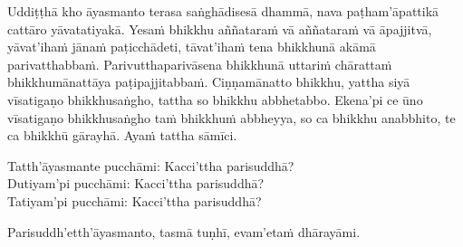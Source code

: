 \begin{center}
	Uddiṭṭhā kho āyasmanto terasa saṅghādisesā dhammā, nava paṭham'āpattikā\makeatletter\hyperlink{endnote103-appendix}\makeatother{} cattāro yāvatatiyakā. Yesaṁ bhikkhu aññataraṁ vā aññataraṁ vā āpajjitvā, yāvat'ihaṁ\makeatletter\hyperlink{endnote104-appendix}\makeatother{} jānaṁ paṭicchādeti, tāvat'ihaṁ\makeatletter\hyperlink{endnote105-appendix}\makeatother{} tena bhikkhunā akāmā parivatthabbaṁ.\makeatletter\hyperlink{endnote106-appendix}\makeatother{} Parivutthaparivāsena\makeatletter\hyperlink{endnote107-appendix}\makeatother{} bhikkhunā uttariṁ\makeatletter\hyperlink{endnote108-appendix}\makeatother{} chārattaṁ bhikkhumānattāya paṭipajjitabbaṁ. Ciṇṇamānatto bhikkhu, yattha siyā vīsatigaṇo bhikkhusaṅgho,\makeatletter\hyperlink{endnote109-appendix}\makeatother{} tattha so bhikkhu\makeatletter\hyperlink{endnote110-appendix}\makeatother{} abbhetabbo. Ekena'pi ce ūno\makeatletter\hyperlink{endnote111-appendix}\makeatother{} vīsatigaṇo bhikkhusaṅgho taṁ bhikkhuṁ abbheyya, so ca bhikkhu anabbhito, te ca bhikkhū gārayhā. Ayaṁ tattha sāmīci.

	\smallskip

	Tatth'āyasmante pucchāmi: Kacci'ttha parisuddhā?\\
	Dutiyam'pi pucchāmi: Kacci'ttha parisuddhā?\\
	Tatiyam'pi pucchāmi: Kacci'ttha parisuddhā?

	\smallskip

	Parisuddh'etth'āyasmanto, tasmā tuṇhī, evam'etaṁ dhārayāmi.
\end{center}


